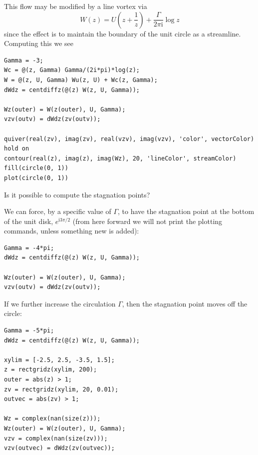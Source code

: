 \documentclass[12pt,fleqn]{article}
\renewcommand{\i}{\mathrm{i}}
\begin{document}
This flow may be modified by a line vortex via
\begin{equation*}
  W(z) = U\left( z + \frac{1}{z} \right) + \frac{\Gamma}{2\pi\i}\log z
\end{equation*}
since the effect is to maintain the boundary of the unit circle as a streamline.
Computing this we see
\begin{lstlisting}
Gamma = -3;
Wc = @(z, Gamma) Gamma/(2i*pi)*log(z);
W = @(z, U, Gamma) Wu(z, U) + Wc(z, Gamma);
dWdz = centdiffz(@(z) W(z, U, Gamma));

Wz(outer) = W(z(outer), U, Gamma);
vzv(outv) = dWdz(zv(outv));

quiver(real(zv), imag(zv), real(vzv), imag(vzv), 'color', vectorColor)
hold on
contour(real(z), imag(z), imag(Wz), 20, 'lineColor', streamColor)
fill(circle(0, 1))
plot(circle(0, 1))
\end{lstlisting}
Is it possible to compute the stagnation points?

We can force, by a specific value of $\Gamma$, to have the stagnation point at the bottom of the unit disk, $e^{\i 3\pi/2}$ (from here forward we will not print the plotting commands, unless something new is added):
\begin{lstlisting}
Gamma = -4*pi;
dWdz = centdiffz(@(z) W(z, U, Gamma));

Wz(outer) = W(z(outer), U, Gamma);
vzv(outv) = dWdz(zv(outv));
\end{lstlisting}

If we further increase the circulation $\Gamma$, then the stagnation point moves off the circle:
\begin{lstlisting}
Gamma = -5*pi;
dWdz = centdiffz(@(z) W(z, U, Gamma));

xylim = [-2.5, 2.5, -3.5, 1.5];
z = rectgridz(xylim, 200);
outer = abs(z) > 1;
zv = rectgridz(xylim, 20, 0.01);
outvec = abs(zv) > 1;

Wz = complex(nan(size(z)));
Wz(outer) = W(z(outer), U, Gamma);
vzv = complex(nan(size(zv)));
vzv(outvec) = dWdz(zv(outvec));
\end{lstlisting}
\end{document}
